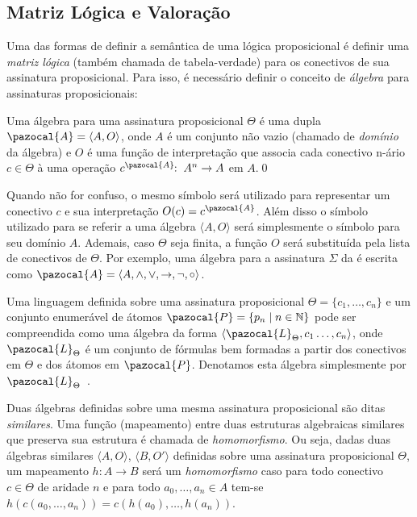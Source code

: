     \subsection{Matriz Lógica e Valoração}
        Uma das formas de definir a semântica de uma lógica proposicional é definir uma \textit{matriz lógica} (também chamada de tabela-verdade) para os conectivos de sua assinatura proposicional. Para isso, é necessário definir o conceito de \textit{álgebra} para assinaturas proposicionais:

        \begin{definicao}\label{def:algebra}
            Uma álgebra para uma assinatura proposicional $\Theta$ é uma dupla $\pazocal{A} = \langle A, O \rangle$, onde $A$ é um conjunto não vazio (chamado de \textit{domínio} da álgebra) e $O$ é uma função de interpretação que associa cada conectivo n-ário $c \in \Theta$ à uma operação $c^{\pazocal{A}}\!\! : \; A^{n} \to A$ em $A$.\qed{}
        \end{definicao}

        Quando não for confuso, o mesmo símbolo será utilizado para representar um conectivo $c$ e sua interpretação $O(c) = c^{\pazocal{A}}$. Além disso o símbolo utilizado para se referir a uma álgebra $\langle A, O \rangle$ será simplesmente o símbolo para seu domínio $A$. Ademais, caso $\Theta$ seja finita, a função $O$ será substituída pela lista de conectivos de $\Theta$. Por exemplo, uma álgebra para a assinatura $\Sigma$ da \lfium{} é escrita como $\pazocal{A} = \langle A,\land, \lor, \to, \neg, \circ \rangle$.

        \begin{observacao}
            Uma linguagem definida sobre uma assinatura proposicional $\Theta = \{c_{1}, \ldots, c_{n}\}$ e um conjunto enumerável de átomos $\pazocal{P} = \{p_{n} \; | \; n \in \mathbb{N} \}$ pode ser compreendida como uma álgebra da forma $\langle \pazocal{L}_{\Theta}, c_{1}\ldots, c_{n} \rangle$, onde $\pazocal{L}_{\Theta}$ é um conjunto de fórmulas bem formadas a partir dos conectivos em $\Theta$ e dos átomos em $\pazocal{P}$. Denotamos esta álgebra simplesmente por $\pazocal{L}_{\Theta}$~\cite{Sikorski1966-SIKAOF,Wojcicki1984-WJCLOP}.
        \end{observacao}

        Duas álgebras definidas sobre uma mesma assinatura proposicional são ditas \textit{similares}. Uma função (mapeamento) entre duas estruturas algebraicas similares que preserva sua estrutura é chamada de \textit{homomorfismo}. Ou seja, dadas duas álgebras similares $\langle A, O \rangle$, $\langle B, O' \rangle$ definidas sobre uma assinatura proposicional $\Theta$, um mapeamento $h : A \to B$ será um \textit{homomorfismo} caso para todo conectivo $c \in \Theta$ de aridade $n$ e para todo $a_{0},\ldots,a_{n} \in A$ tem-se $h(c(a_{0},\ldots, a_{n})) = c(h(a_{0}),\ldots, h(a_{n}))$.

